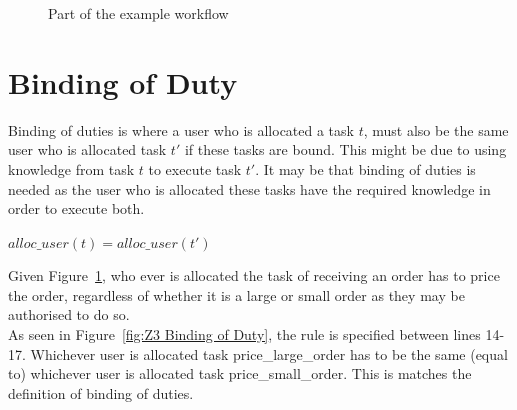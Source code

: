 \documentclass[a4paper]{report}
\begin{document}
\begin{figure}[!htb]
\centering
{}
\caption{Part of the example workflow}
\label{fig:Part of the example workflow}
\end{figure}

\section{Binding of Duty}
Binding of duties\cite{bod} is where a user who is allocated a task $t$, must also be the same user who is allocated task $t\ensuremath{'}$ if these tasks are bound. This might be due to using knowledge from task $t$ to execute task $t\ensuremath{'}$. It may be that binding of duties is needed as the user who is allocated these tasks have the required knowledge in order to execute both.\\
\begin{center}
$alloc\_user(t) = alloc\_user(t\ensuremath{'})$
\end{center}

Given Figure~\ref{fig:Part of the example workflow}, who ever is allocated the task of receiving an order has to price the order, regardless of whether it is a large or small order as they may be authorised to do so. \\

As seen in Figure~\ref{fig:Z3 Binding of Duty}, the rule is specified between lines 14-17. Whichever user is allocated task price\_large\_order has to be the same (equal to) whichever user is allocated task price\_small\_order. This is matches the definition of binding of duties.\\
\end{document}
